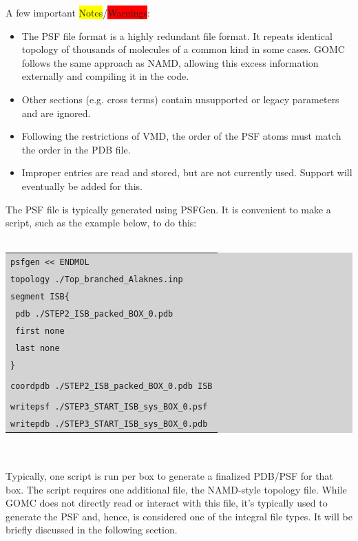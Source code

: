 A few important \colorbox{yellow}{Notes}/\colorbox{red}{Warnings}:
\begin{itemize}
\item The PSF file format is a highly redundant file format.  It repeats identical topology of thousands of molecules of a common kind in some cases. GOMC follows the same approach as NAMD, allowing this excess information externally and compiling it in the code.
\item Other sections (e.g. cross terms) contain unsupported or legacy parameters and are ignored.
\item Following the restrictions of VMD, the order of the PSF atoms must match the order in the PDB file.
\item Improper entries are read and stored, but are not currently used.  Support will eventually be added for this.
\end{itemize}
The PSF file is typically generated using PSFGen. It is convenient to make a script, such as the example below, to do this:\\\\
\colorbox{lightgray}{
\begin{tabular}{l}
\texttt{psfgen << ENDMOL}\\
\texttt{topology ./Top\_branched\_Alaknes.inp}\\
\texttt{segment ISB\{}\\
\texttt{    pdb ./STEP2\_ISB\_packed\_BOX\_0.pdb}\\
\texttt{    first none}\\
\texttt{    last none}\\
\texttt{\}}\\\\
\texttt{coordpdb ./STEP2\_ISB\_packed\_BOX\_0.pdb ISB}\\\\
\texttt{writepsf ./STEP3\_START\_ISB\_sys\_BOX\_0.psf}\\
\texttt{writepdb ./STEP3\_START\_ISB\_sys\_BOX\_0.pdb}\\
\end{tabular}
}\\\\
Typically, one script is run per box to generate a finalized PDB/PSF for that box. The script requires one additional file, the NAMD-style topology file. While GOMC does not directly read or interact with this file, it's typically used to generate the PSF and, hence, is considered one of the integral file types. It will be briefly discussed in the following section.\\\\

